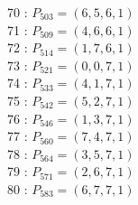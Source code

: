 \documentclass{article}
\begin{document}
{\begin{multicols}{3}
70 : $P_{503}=( 6, 5, 6, 1 )$\\
71 : $P_{509}=( 4, 6, 6, 1 )$\\
72 : $P_{514}=( 1, 7, 6, 1 )$\\
73 : $P_{521}=( 0, 0, 7, 1 )$\\
74 : $P_{533}=( 4, 1, 7, 1 )$\\
75 : $P_{542}=( 5, 2, 7, 1 )$\\
76 : $P_{546}=( 1, 3, 7, 1 )$\\
77 : $P_{560}=( 7, 4, 7, 1 )$\\
78 : $P_{564}=( 3, 5, 7, 1 )$\\
79 : $P_{571}=( 2, 6, 7, 1 )$\\
80 : $P_{583}=( 6, 7, 7, 1 )$\\
\end{multicols}


%


%


}%
\end{document}
